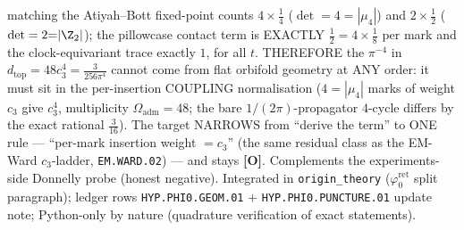 \documentclass[11pt]{article}
\providecommand{\mO}{\textbf{[O]}}\providecommand{\mX}{\textbf{[X]}}
\providecommand{\cthree}{c_3}\providecommand{\phiz}{\varphi_0^{\mathrm{ret}}}
\providecommand{\Oadm}{\Omega_{\mathrm{adm}}}\providecommand{\ainv}{\alpha^{-1}}
\begin{document}
\begin{itemize}[leftmargin=1.5em]
matching the Atiyah--Bott fixed-point counts $4{\times}\tfrac14$ ($\det=4{=}|\mu_4|$) and
$2{\times}\tfrac12$ ($\det=2{=}|\Z_2|$); the pillowcase contact term is EXACTLY $\tfrac12=4\times\tfrac18$
per mark and the clock-equivariant trace exactly $1$, for all $t$. THEREFORE the $\pi^{-4}$ in
$d_{\mathrm{top}}=48\cthree^4=\tfrac{3}{256\pi^4}$ cannot come from flat orbifold geometry at ANY order:
it must sit in the per-insertion COUPLING normalisation ($4{=}|\mu_4|$ marks of weight $\cthree$ give
$\cthree^4$, multiplicity $\Oadm{=}48$; the bare $1/(2\pi)$-propagator $4$-cycle differs by the exact
rational $\tfrac{3}{16}$). The target NARROWS from ``derive the term'' to ONE rule --- ``per-mark
insertion weight $=\cthree$'' (the same residual class as the EM-Ward $\cthree$-ladder,
\texttt{EM.WARD.02}) --- and stays \mO. Complements the experiments-side Donnelly probe (honest
negative). Integrated in \texttt{origin\_theory} ($\phiz$ split paragraph); ledger rows
\texttt{HYP.PHI0.GEOM.01} $+$ \texttt{HYP.PHI0.PUNCTURE.01} update note; Python-only by nature
(quadrature verification of exact statements).
\end{itemize}
\end{document}
